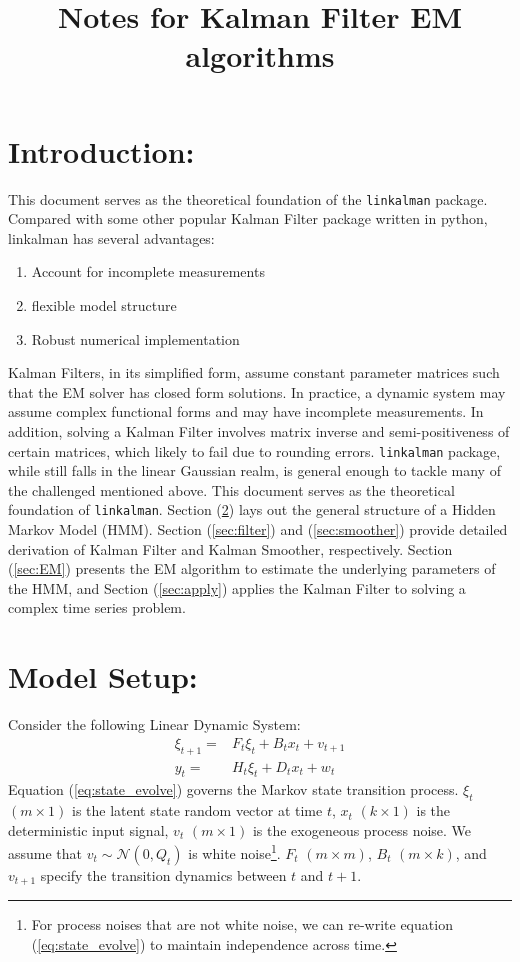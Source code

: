 \documentclass[12pt]{article}
\newenvironment{boenumerate}
    {\begin{enumerate}\renewcommand\labelenumi{\textbf\theenumi}}
    {\end{enumerate}}
\numberwithin{equation}{section}
\begin{document}
\title{Notes for Kalman Filter EM algorithms}

\section{Introduction:}
This document serves as the theoretical foundation of the \texttt{linkalman} package. Compared with some other popular Kalman Filter package written in python, linkalman has several advantages:
\begin{boenumerate}
    \item Account for incomplete measurements 
    \item flexible model structure
    \item Robust numerical implementation
\end{boenumerate}
Kalman Filters, in its simplified form, assume constant parameter matrices such that the EM solver has closed form solutions. In practice, a dynamic system may assume complex functional forms and may have incomplete measurements. In addition, solving a Kalman Filter involves matrix inverse and semi-positiveness of certain matrices, which likely to fail due to rounding errors. \texttt{linkalman} package, while still falls in the linear Gaussian realm, is general enough to tackle many of the challenged mentioned above. This document serves as the theoretical foundation of \texttt{linkalman}. Section (\ref{sec:model_setup}) lays out the general structure of a Hidden Markov Model (HMM). Section (\ref{sec:filter}) and (\ref{sec:smoother}) provide detailed derivation of Kalman Filter and Kalman Smoother, respectively. Section (\ref{sec:EM}) presents the EM algorithm to estimate the underlying parameters of the HMM, and Section (\ref{sec:apply}) applies the Kalman Filter to solving a complex time series problem. 

\section{Model Setup:} \label{sec:model_setup}
Consider the following Linear Dynamic System:
\begin{align}
    \xi_{t+1} = & F_{t}\xi_{t} + B_{t}x_t + v_{t+1} \label{eq:state_evolve} \\
    y_t = & H_t\xi_{t} + D_{t}x_t + w_t \label{eq:measure}
\end{align}
Equation (\ref{eq:state_evolve}) governs the Markov state transition process. $\xi_t$ $(m\times 1)$ is the latent state random vector at time $t$, $x_t$ $(k\times 1)$ is the deterministic input signal, $v_t$ $(m\times 1)$ is the exogeneous process noise. We assume that $v_t\sim \mathcal{N}(0,Q_t)$ is white noise\footnote{For process noises that are not white noise, we can re-write equation (\ref{eq:state_evolve}) to maintain independence across time.}. $F_t$ $(m\times m)$, $B_t$ $(m\times k)$, and $v_{t+1}$ specify the transition dynamics between $t$ and $t+1$. 
\end{document}
